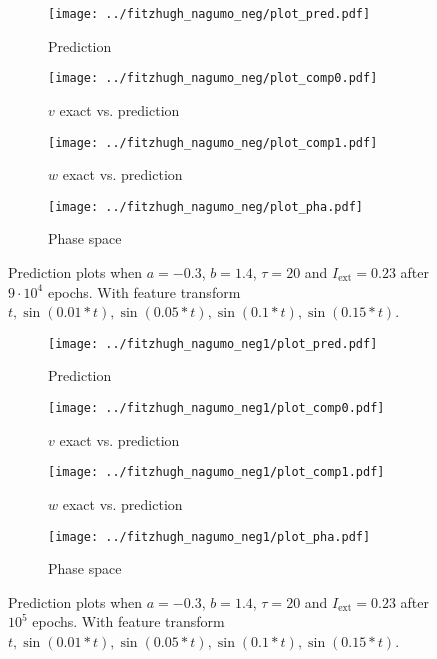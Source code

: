 \documentclass[a4paper]{article}
\begin{document}
\begin{figure}[H]
	\centering 
	\begin{subfigure}[b]{0.47\textwidth}
		\centering
		\texttt{[image: ../fitzhugh\_nagumo\_neg/plot\_pred.pdf]}
		\caption{Prediction}
		\label{fig:neg1a}
	\end{subfigure}
	\begin{subfigure}[b]{0.47\textwidth}
		\centering
		\texttt{[image: ../fitzhugh\_nagumo\_neg/plot\_comp0.pdf]}
		\caption{$v$ exact vs. prediction}
		\label{fig:neg1b}
	\end{subfigure}
	\begin{subfigure}[b]{0.47\textwidth}
		\centering
		\texttt{[image: ../fitzhugh\_nagumo\_neg/plot\_comp1.pdf]}
		\caption{$w$ exact vs. prediction}
		\label{fig:neg1c}
	\end{subfigure}
	\begin{subfigure}[b]{0.47\textwidth}
		\centering
		\texttt{[image: ../fitzhugh\_nagumo\_neg/plot\_pha.pdf]}
		\caption{Phase space}
		\label{fig:neg1d}
	\end{subfigure}
	\caption{Prediction plots when $a=-0.3$, $b=1.4$, $\tau=20$ and $ I_{\text{ext}}=0.23$ after $9\cdot10^4$ epochs. With feature transform $t, \sin(0.01 * t), \sin(0.05 * t), \sin(0.1 * t), \sin(0.15 * t)$.}
	\label{plot:neg1}
\end{figure}

\begin{figure}[H]
	\centering 
	\begin{subfigure}[b]{0.47\textwidth}
		\centering
		\texttt{[image: ../fitzhugh\_nagumo\_neg1/plot\_pred.pdf]}
		\caption{Prediction}
		\label{fig:neg2a}
	\end{subfigure}
	\begin{subfigure}[b]{0.47\textwidth}
		\centering
		\texttt{[image: ../fitzhugh\_nagumo\_neg1/plot\_comp0.pdf]}
		\caption{$v$ exact vs. prediction}
		\label{fig:neg2b}
	\end{subfigure}
	\begin{subfigure}[b]{0.47\textwidth}
		\centering
		\texttt{[image: ../fitzhugh\_nagumo\_neg1/plot\_comp1.pdf]}
		\caption{$w$ exact vs. prediction}
		\label{fig:neg2c}
	\end{subfigure}
	\begin{subfigure}[b]{0.47\textwidth}
		\centering
		\texttt{[image: ../fitzhugh\_nagumo\_neg1/plot\_pha.pdf]}
		\caption{Phase space}
		\label{fig:neg2d}
	\end{subfigure}
	\caption{Prediction plots when $a=-0.3$, $b=1.4$, $\tau=20$ and $ I_{\text{ext}}=0.23$ after $10^5$ epochs. With feature transform $t, \sin(0.01 * t), \sin(0.05 * t), \sin(0.1 * t), \sin(0.15 * t)$.}
	\label{plot:neg2}
\end{figure}
\end{document}
